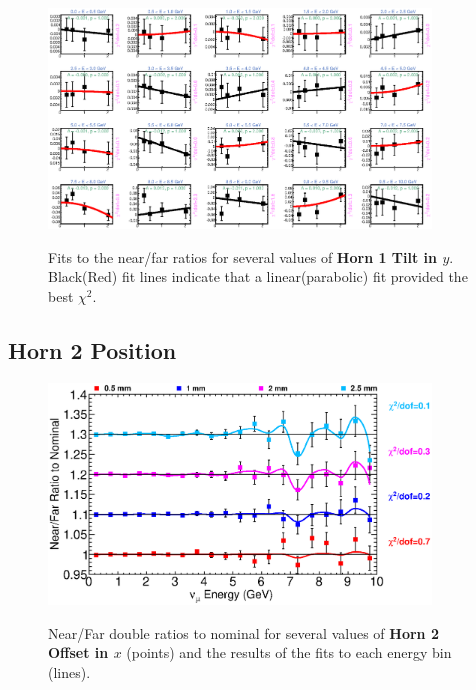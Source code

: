 \begin{figure}[hb]
  \begin{center}
    {\includegraphics[width=4.0in]{figures/Horn1YTilt_nof_fits.eps}}
  \end{center}
\caption{ Fits to the near/far ratios for several values of {\bf Horn 1 Tilt in $y$}. Black(Red) fit lines indicate that a linear(parabolic) fit provided the best $\chi^2$. }
\end{figure}

\clearpage
\subsection{Horn 2 Position}

\begin{figure}[ht]
  \begin{center}
    {\includegraphics[width=4.0in]{figures/Horn2XOffset_nof_summary.eps}}
  \end{center}
\caption{ Near/Far double ratios to nominal for several values of {\bf Horn 2 Offset in $x$} (points) and the results of the fits to each energy bin (lines).}
\end{figure}

